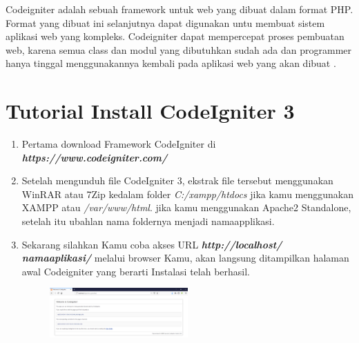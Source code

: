 Codeigniter adalah sebuah framework untuk web yang dibuat dalam format PHP. Format yang dibuat ini selanjutnya dapat digunakan untu membuat sistem aplikasi web yang kompleks. Codeigniter dapat mempercepat proses pembuatan web, karena semua class dan modul yang dibutuhkan sudah ada dan programmer hanya tinggal menggunakannya kembali pada aplikasi web yang akan dibuat \cite{prabowo2015website}.

\section{Tutorial Install CodeIgniter 3}
    \begin{enumerate}
        \item Pertama download Framework CodeIgniter di \textbf{\textit{https://www.codeigniter.com/}}
        
	    \item Setelah mengunduh file CodeIgniter 3, ekstrak file tersebut menggunakan WinRAR atau 7Zip kedalam folder \textit{C:/xampp/htdocs} jika kamu menggunakan XAMPP atau \textit{/var/www/html}. jika kamu menggunakan Apache2 Standalone, setelah itu ubahlan nama foldernya menjadi namaapplikasi.
	    
	    \item Sekarang silahkan Kamu coba akses URL \textbf{\textit{http://localhost/ namaaplikasi/}} melalui browser Kamu, akan langsung ditampilkan halaman awal Codeigniter yang berarti Instalasi telah berhasil.
		\begin{figure}[!htbp]
    		\centering
    		\includegraphics[width=0.5\textwidth]{figures/CodeIgniter1.PNG}
    		\label{CodeIgniter1}
		\end{figure}
    \end{enumerate}
    
